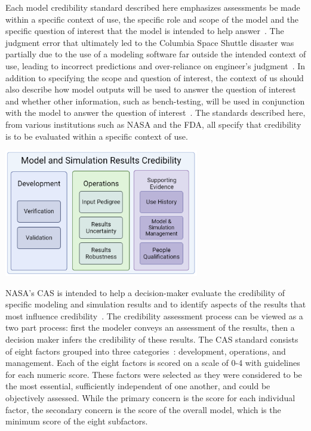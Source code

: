 \documentclass[12pt]{report}
\begin{document}
Each model credibility standard described here emphasizes assessments be made within a specific context of use, the specific role and scope of the model and the specific question of interest that the model is intended to help answer~\cite{FDAguidelines}. The judgment error that ultimately led to the Columbia Space Shuttle disaster was partially due to the use of a modeling software far outside the intended context of use, leading to incorrect predictions and over-reliance on engineer's judgment~\cite{Blattnig2013-qx}. In addition to specifying the scope and question of interest, the context of us should also describe how model outputs will be used to answer the question of interest and whether other information, such as bench-testing, will be used in conjunction with the model to answer the question of interest~\cite{FDAguidelines}. The standards described here, from various institutions such as NASA and the FDA, all specify that credibility is to be evaluated within a specific context of use.

\begin{center}
    \captionsetup{type=figure}
    \includegraphics[width=8.5cm]{images/NASA_CAS.png}
    \label{fig:NASA}
\end{center}


NASA's CAS is intended to help a decision-maker evaluate the credibility of specific modeling and simulation results and to identify aspects of the results that most influence credibility~\cite{blattnig_towards_2008, Blattnig2013-qx}. The credibility assessment process can be viewed as a two part process: first the modeler conveys an assessment of the results, then a decision maker infers the credibility of these results. The CAS standard consists of eight factors grouped into three categories~\cite{babula_nasa_2009}: development, operations, and management. Each of the eight factors is scored on a scale of 0-4 with guidelines for each numeric score. These factors were selected as they were considered to be the most essential, sufficiently independent of one another, and could be objectively assessed. While the primary concern is the score for each individual factor, the secondary concern is the score of the overall model, which is the minimum score of the eight subfactors. 
\end{document}
